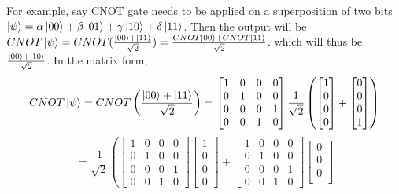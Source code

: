 \begin{importantnote}
    For example, say CNOT gate needs to be applied on a superposition of two bits $\ket{\psi}=\alpha\ket{00}+\beta\ket{01}+\gamma\ket{10}+\delta\ket{11}$.
    Then the output will be $CNOT\ket{\psi}=CNOT(\frac{\ket{00}+\ket{11}}{\sqrt{2}})=\frac{CNOT\ket{00}+CNOT\ket{11}}{\sqrt{2}}$.
    which will thus be $\frac{\ket{00}+\ket{10}}{\sqrt{2}}$.
    In the matrix form, 
    \[
        CNOT\ket{\psi}=CNOT\left(\frac{\ket{00}+\ket{11}}{\sqrt{2}}\right)=\begin{bmatrix}
            1 & 0 & 0 & 0 \\
            0 & 1 & 0 & 0 \\
            0 & 0 & 0 & 1 \\
            0 & 0 & 1 & 0
        \end{bmatrix}\frac{1}{\sqrt{2}}\left(\begin{bmatrix}
            1 \\
            0 \\
            0 \\
            0
        \end{bmatrix}+\begin{bmatrix}
            0 \\
            0 \\
            0 \\
            1
        \end{bmatrix}\right)
    \]
    \[=\frac{1}{\sqrt{2}}\left(\begin{bmatrix}
        1 & 0 & 0 & 0 \\
        0 & 1 & 0 & 0 \\
        0 & 0 & 0 & 1 \\
        0 & 0 & 1 & 0
    \end{bmatrix}\begin{bmatrix}
        1 \\
        0 \\
        0 \\
        0
    \end{bmatrix}+\begin{bmatrix}
        1 & 0 & 0 & 0 \\
        0 & 1 & 0 & 0 \\
        0 & 0 & 0 & 1 \\
        0 & 0 & 1 & 0
    \end{bmatrix}\begin{bmatrix}
        0 \\
        0 \\
        0 \\

\end{bmatrix}\]
\end{importantnote}
